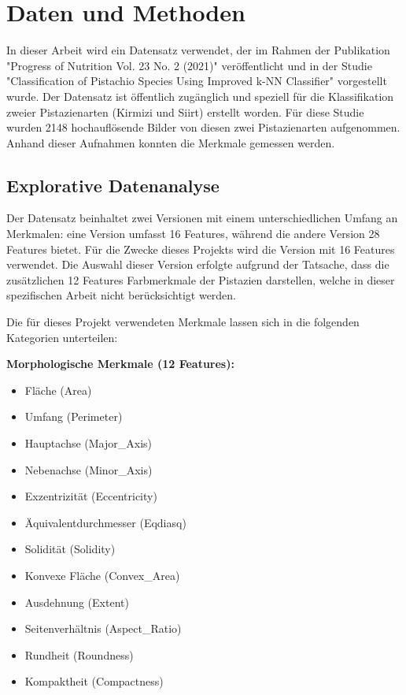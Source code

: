 \section{Daten und Methoden}

In dieser Arbeit wird ein Datensatz verwendet, der im Rahmen der Publikation "Progress of Nutrition Vol. 23 No. 2 (2021)" veröffentlicht und in der Studie "Classification of Pistachio Species Using Improved k-NN Classifier"\cite{Ozkan.2021} vorgestellt wurde. Der Datensatz ist öffentlich zugänglich und speziell für die Klassifikation zweier Pistazienarten (\glqq{}Kirmizi\grqq{} und \glqq{}Siirt\grqq{}) erstellt worden. Für diese Studie wurden 2148 hochauflösende Bilder von diesen zwei Pistazienarten aufgenommen. Anhand dieser Aufnahmen konnten die Merkmale gemessen werden.

\subsection{Explorative Datenanalyse} 
Der Datensatz beinhaltet zwei Versionen mit einem unterschiedlichen Umfang an Merkmalen: eine Version umfasst 16 Features, während die andere Version 28 Features bietet. Für die Zwecke dieses Projekts wird die Version mit 16 Features verwendet. Die Auswahl dieser Version erfolgte aufgrund der Tatsache, dass die zusätzlichen 12 Features Farbmerkmale der Pistazien darstellen, welche in dieser spezifischen Arbeit nicht berücksichtigt werden.

Die für dieses Projekt verwendeten Merkmale lassen sich in die folgenden Kategorien unterteilen:

\textbf{Morphologische Merkmale (12 Features):}
\begin{itemize}[itemsep=0pt, parsep=0pt]
	\item Fläche (Area)
	\item Umfang (Perimeter)
	\item Hauptachse (Major\_Axis)
	\item Nebenachse (Minor\_Axis)
	\item Exzentrizität (Eccentricity)
	\item Äquivalentdurchmesser (Eqdiasq)
	\item Solidität (Solidity)
	\item Konvexe Fläche (Convex\_Area)
	\item Ausdehnung (Extent)
	\item Seitenverhältnis (Aspect\_Ratio)
	\item Rundheit (Roundness)
	\item Kompaktheit (Compactness)
\end{itemize}

